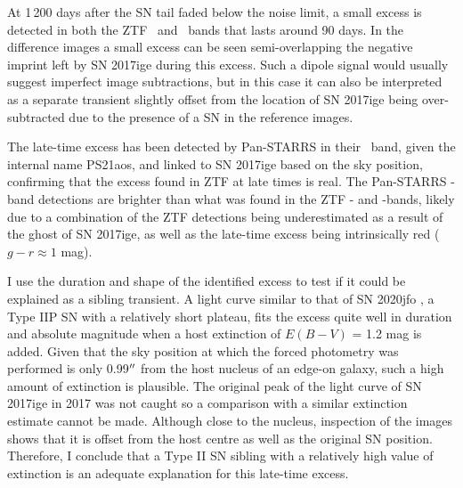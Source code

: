 \documentclass[a4paper,oneside,12pt, class=Latex/Classes/PhDthesisPSnPDF, crop=false]{standalone}
\begin{document}
At 1\,200 days after the SN tail faded below the noise limit, a small excess is detected in both the ZTF \ztfg~and \ztfr~bands that lasts around 90 days. In the difference images a small excess can be seen semi-overlapping the negative imprint left by SN 2017ige during this excess. Such a dipole signal would usually suggest imperfect image subtractions, but in this case it can also be interpreted as a separate transient slightly offset from the location of SN 2017ige being over-subtracted due to the presence of a SN in the reference images.

The late-time excess has been detected by Pan-STARRS in their \ztfi\ band, given the internal name PS21aos, and linked to SN 2017ige based on the sky position, confirming that the excess found in ZTF at late times is real. The Pan-STARRS \ztfi-band detections are brighter than what was found in the ZTF \ztfg- and \ztfr-bands, likely due to a combination of the ZTF detections being underestimated as a result of the ghost of SN 2017ige, as well as the late-time excess being intrinsically red ($g - r \approx 1$ mag). 

I use the duration and shape of the identified excess to test if it could be explained as a sibling transient. A light curve similar to that of SN 2020jfo \citep{Sollerman_2020jfo, IIp_ext}, a Type IIP SN with a relatively short plateau, fits the excess quite well in duration and absolute magnitude when a host extinction of $ E(B - V)$ = 1.2 mag is added. Given that the sky position at which the forced photometry was performed is only 0.99$^{\prime\prime}$ from the host nucleus of an edge-on galaxy, such a high amount of extinction is plausible. The original peak of the light curve of SN 2017ige in 2017 was not caught so a comparison with a similar extinction estimate cannot be made. Although close to the nucleus, inspection of the images shows that it is offset from the host centre as well as the original SN position. Therefore, I conclude that a Type II SN sibling with a relatively high value of extinction is an adequate explanation for this late-time excess.\\
\end{document}
